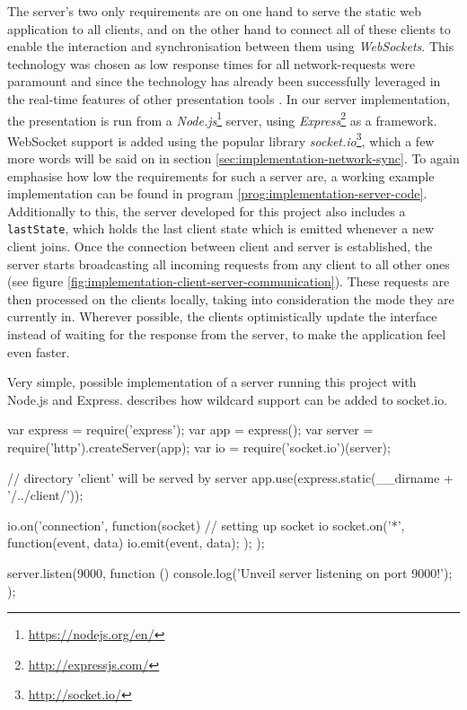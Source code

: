 The server's two only requirements are on one hand to serve the static web application to all clients, and on the other hand to connect all of these clients to enable the interaction and synchronisation between them using \emph{WebSockets}. This technology was chosen as low response times for all network-requests were paramount and since the technology has already been successfully leveraged in the real-time features of other presentation tools \cite{Inoue:RealTimeQuestionnaire, Triglianos:InteractiveWebPresentationsImpress}. In our server implementation, the presentation is run from a \emph{Node.js}\footnote{\url{https://nodejs.org/en/}} server, using \emph{Express}\footnote{\url{http://expressjs.com/}} as a framework. WebSocket support is added using the popular library \emph{socket.io}\footnote{\url{http://socket.io/}}, which a few more words will be said on in section \ref{sec:implementation-network-sync}.
To again emphasise how low the requirements for such a server are, a working example implementation can be found in program \ref{prog:implementation-server-code}. Additionally to this, the server developed for this project also includes a \texttt{lastState}, which holds the last client state which is emitted whenever a new client joins. Once the connection between client and server is established, the server starts broadcasting all incoming requests from any client to all other ones (see figure \ref{fig:implementation-client-server-communication}). These requests are then processed on the clients locally, taking into consideration the mode they are currently in. Wherever possible, the clients optimistically update the interface instead of waiting for the response from the server, to make the application feel even faster.

\begin{program}
\caption{Very simple, possible implementation of a server running this project with Node.js and Express. \cite{socket-io-wildcards} describes how wildcard support can be added to socket.io.}
\label{prog:implementation-server-code}
\begin{JsCode}
var express = require('express'); var app = express();
var server = require('http').createServer(app);
var io = require('socket.io')(server);

// directory 'client' will be served by server
app.use(express.static(__dirname + '/../client/'));

io.on('connection', function(socket) { // setting up socket io
  socket.on('*', function(event, data) {
    io.emit(event, data);
  });
});

server.listen(9000, function () {
  console.log('Unveil server listening on port 9000!');
});
\end{JsCode}
\end{program}


